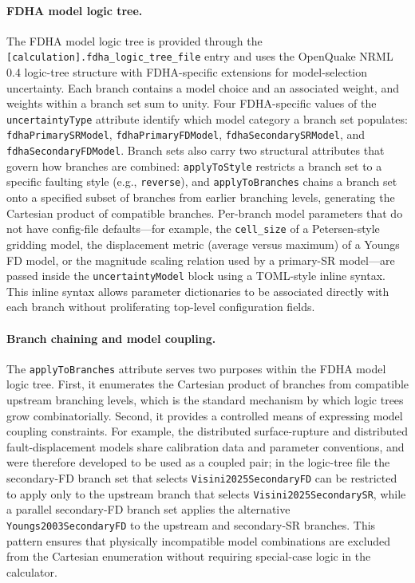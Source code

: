 \paragraph{FDHA model logic tree.}
The FDHA model logic tree is provided through the \texttt{[calculation].fdha\_logic\_tree\_file} entry and uses the OpenQuake NRML 0.4 logic-tree structure with FDHA-specific extensions for model-selection uncertainty. Each branch contains a model choice and an associated weight, and weights within a branch set sum to unity. Four FDHA-specific values of the \texttt{uncertaintyType} attribute identify which model category a branch set populates: \texttt{fdhaPrimarySRModel}, \texttt{fdhaPrimaryFDModel}, \texttt{fdhaSecondarySRModel}, and \texttt{fdhaSecondaryFDModel}. Branch sets also carry two structural attributes that govern how branches are combined: \texttt{applyToStyle} restricts a branch set to a specific faulting style (e.g., \texttt{reverse}), and \texttt{applyToBranches} chains a branch set onto a specified subset of branches from earlier branching levels, generating the Cartesian product of compatible branches. Per-branch model parameters that do not have config-file defaults---for example, the \texttt{cell\_size} of a Petersen-style gridding model, the displacement metric (average versus maximum) of a Youngs FD model, or the magnitude scaling relation used by a primary-SR model---are passed inside the \texttt{uncertaintyModel} block using a TOML-style inline syntax. This inline syntax allows parameter dictionaries to be associated directly with each branch without proliferating top-level configuration fields.

\paragraph{Branch chaining and model coupling.}
The \texttt{applyToBranches} attribute serves two purposes within the FDHA model logic tree. First, it enumerates the Cartesian product of branches from compatible upstream branching levels, which is the standard mechanism by which logic trees grow combinatorially. Second, it provides a controlled means of expressing model coupling constraints. For example, the \citet{Visini2025} distributed surface-rupture and distributed fault-displacement models share calibration data and parameter conventions, and were therefore developed to be used as a coupled pair; in the logic-tree file the secondary-FD branch set that selects \texttt{Visini2025SecondaryFD} can be restricted to apply only to the upstream branch that selects \texttt{Visini2025SecondarySR}, while a parallel secondary-FD branch set applies the alternative \texttt{Youngs2003SecondaryFD} to the upstream \citet{youngs_methodology_2003} and \citet{Takao2013} secondary-SR branches. This pattern ensures that physically incompatible model combinations are excluded from the Cartesian enumeration without requiring special-case logic in the calculator.

